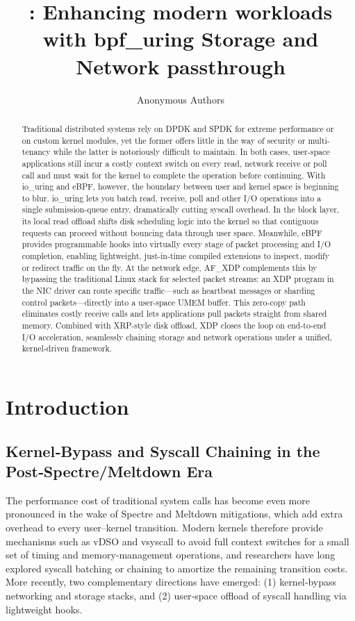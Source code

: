 \documentclass[sigconf,10pt]{acmart}
\title{\sys: Enhancing modern workloads with bpf\_uring Storage and Network passthrough}
\author{
Anonymous Authors
}
\begin{document}
\begin{abstract}

Traditional distributed systems rely on DPDK and SPDK for extreme performance or on custom kernel modules, yet the former offers little in the way of security or multi-tenancy while the latter is notoriously difficult to maintain. In both cases, user-space applications still incur a costly context switch on every read, network receive or poll call and must wait for the kernel to complete the operation before continuing. With io\_uring and eBPF, however, the boundary between user and kernel space is beginning to blur. io\_uring lets you batch read, receive, poll and other I/O operations into a single submission-queue entry, dramatically cutting syscall overhead. In the block layer, its local read offload shifts disk scheduling logic into the kernel so that contiguous requests can proceed without bouncing data through user space. Meanwhile, eBPF provides programmable hooks into virtually every stage of packet processing and I/O completion, enabling lightweight, just-in-time compiled extensions to inspect, modify or redirect traffic on the fly. At the network edge, AF\_XDP complements this by bypassing the traditional Linux stack for selected packet streams: an XDP program in the NIC driver can route specific traffic—such as heartbeat messages or sharding control packets—directly into a user-space UMEM buffer. This zero-copy path eliminates costly receive calls and lets applications pull packets straight from shared memory. Combined with XRP-style disk offload, XDP closes the loop on end-to-end I/O acceleration, seamlessly chaining storage and network operations under a unified, kernel-driven framework.


\end{abstract}

\maketitle

\section{Introduction}
\subsection{Kernel‐Bypass and Syscall Chaining in the Post‐Spectre/Meltdown Era}

The performance cost of traditional system calls has become even more pronounced in the wake of Spectre and Meltdown mitigations, which add extra overhead to every user–kernel transition.  Modern kernels therefore provide mechanisms such as vDSO and vsyscall to avoid full context switches for a small set of timing and memory‐management operations, and researchers have long explored syscall batching or chaining to amortize the remaining transition costs.  More recently, two complementary directions have emerged: (1) kernel‐bypass networking and storage stacks, and (2) user‐space offload of syscall handling via lightweight hooks.
\end{document}

